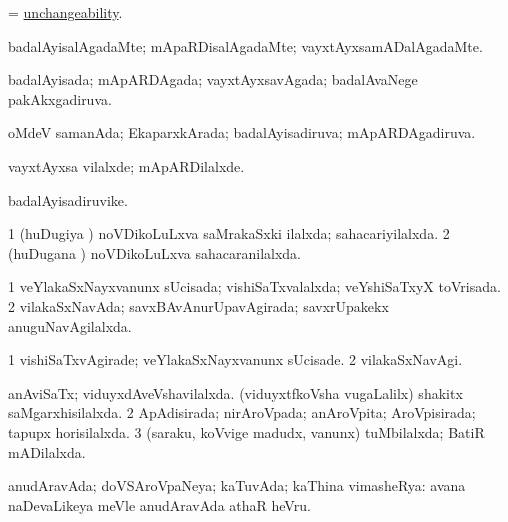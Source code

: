 \bentry
{} 
\gl{\nA}
\expl{}
\bmng
= \hyperlink{unchangeability}{unchangeability}. 
\emng
\eentry

\bentry
{} 
\gl{\kirxvi}
\expl{}
\bmng
badalAyisalAgadaMte; mApaRDisalAgadaMte; vayxtAyxsamADalAgadaMte. 
\emng
\eentry

\bentry
{} 
\gl{\gu}
\expl{}
\bmng
badalAyisada; mApARDAgada; vayxtAyxsavAgada; badalAvaNege pakAkxgadiruva. 
\emng
\eentry

\bentry
{} 
\gl{\gu}
\expl{}
\bmng
oMdeV samanAda; EkaparxkArada; badalAyisadiruva; mApARDAgadiruva. 
\emng
\eentry

\bentry
{} 
\gl{\kirxvi}
\expl{}
\bmng
vayxtAyxsa vilalxde; mApARDilalxde. 
\emng
\eentry

\bentry
{} 
\gl{\nA}
\expl{}
\bmng
badalAyisadiruvike. 
\emng
\eentry

\bentry
{} 
\gl{\gu}
\expl{}
\bmng
\bnum
\num{1} (huDugiya \vi) noVDikoLuLxva saMrakaSxki ilalxda; sahacariyilalxda. 
\num{2} (huDugana \vi) noVDikoLuLxva sahacaranilalxda. 
\enum
\emng
\eentry

\bentry
{} 
\gl{\gu}
\expl{}
\bmng
\bnum
\num{1} veYlakaSxNayxvanunx sUcisada; vishiSaTxvalalxda; veYshiSaTxyX toVrisada. 
\num{2} vilakaSxNavAda; savxBAvAnurUpavAgirada; savxrUpakekx anuguNavAgilalxda. 
\enum
\emng
\eentry

\bentry
{} 
\gl{\kirxvi}
\expl{}
\bmng
\bnum
\num{1} vishiSaTxvAgirade; veYlakaSxNayxvanunx sUcisade. 
\num{2} vilakaSxNavAgi. 
\enum
\emng
\eentry

\bentry
{} 
\gl{\gu}
\expl{}
\bmng
\bnum
{} 
\banum
{} anAviSaTx; viduyxdAveVshavilalxda. 
 (viduyxtfkoVsha \mo vugaLalilx) shakitx saMgarxhisilalxda. 
\eanum
\numie
\num{2} ApAdisirada; nirAroVpada; anAroVpita; AroVpisirada; tapupx horisilalxda. 
\num{3} (saraku, koVvige madudx, \mo vanunx) tuMbilalxda; BatiR mADilalxda. 
\enum
\emng
\eentry

\bentry
{} 
\gl{\gu}
\expl{}
\bmng
anudAravAda; doVSAroVpaNeya; kaTuvAda; kaThina vimasheRya:  avana naDevaLikeya meVle anudAravAda athaR heVru. 
\emng
\eentry

